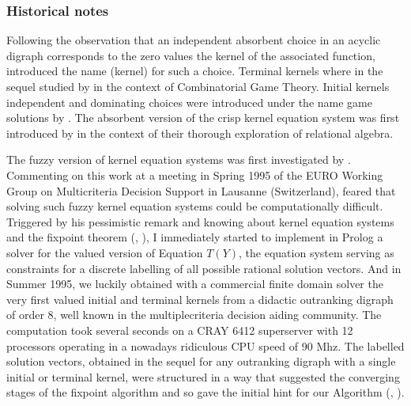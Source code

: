 \documentclass[a4paper,12pt,english]{sphinxhowto}
\begin{document}
\subsubsection{Historical notes}
\label{\detokenize{pearls:historical-notes}}
\sphinxAtStartPar
Following the observation that an independent absorbent choice in an acyclic digraph corresponds to the zero values \textendash{}the kernel\textendash{} of the associated  function,   introduced the name  (kernel) for such a choice. Terminal kernels where in the sequel studied by   in the context of Combinatorial Game Theory. Initial kernels \textendash{}independent and dominating choices\textendash{} were introduced under the name game solutions by  . The absorbent version of the crisp kernel equation system  was first introduced by   in the context of their thorough exploration of relational algebra.

\sphinxAtStartPar
The fuzzy version of kernel equation systems was first investigated by  . Commenting on this work at a meeting in Spring 1995 of the EURO Working Group on Multicriteria Decision Support in Lausanne (Switzerland),  feared that solving such fuzzy kernel equation systems could be computationally difficult. Triggered by his pessimistic remark and knowing about kernel equation systems and the  fixpoint theorem (, ), I immediately started to implement in Prolog a solver for the valued version of Equation \(T(Y)\), the equation system serving as constraints for a discrete labelling of all possible rational solution vectors. And in Summer 1995, we luckily obtained with a commercial finite domain solver the very first valued initial and terminal kernels from a didactic outranking digraph of order 8, well known in the multiple\sphinxhyphen{}criteria decision aiding community. The computation took several seconds on a CRAY 6412 superserver with 12 processors operating in a nowadays ridiculous CPU speed of 90 Mhz. The labelled solution vectors, obtained in the sequel for any outranking digraph with a single initial or terminal kernel, were structured in a way that suggested the converging stages of the  fixpoint algorithm and so gave the initial hint for our Algorithm (, ).
\end{document}
